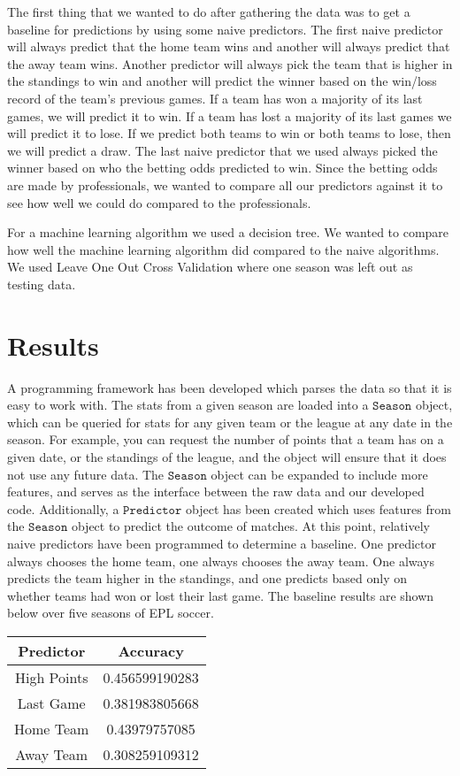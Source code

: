 \documentclass[conference]{IEEEtran}
\begin{document}
The first thing that we wanted to do after gathering the data was to get a baseline for predictions by using some naive predictors. The first naive predictor will always predict that the home team wins and another will always predict that the away team wins. Another predictor will always pick the team that is higher in the standings to win and another will predict the winner based on the win/loss record of the team's previous games. If a team has won a majority of its last games, we will predict it to win. If a team has lost a majority of its last games we will predict it to lose. If we predict both teams to win or both teams to lose, then we will predict a draw. The last naive predictor that we used always picked the winner based on who the betting odds predicted to win. Since the betting odds are made by professionals, we wanted to compare all our predictors against it to see how well we could do compared to the professionals.

For a machine learning algorithm we used a decision tree. We wanted to compare how well the machine learning algorithm did compared to the naive algorithms. We used Leave One Out Cross Validation where one season was left out as testing data.

\section{Results}
A programming framework has been developed which parses the data so that it is easy to work with. The stats from a given season are loaded into a $\mathtt{Season}$ object, which can be queried for stats for any given team or the league at any date in the season. For example, you can request the number of points that a team has on a given date, or the standings of the league, and the object will ensure that it does not use any future data. The $\mathtt{Season}$ object can be expanded to include more features, and serves as the interface between the raw data and our developed code. Additionally, a $\mathtt{Predictor}$ object has been created which uses features from the $\mathtt{Season}$ object to predict the outcome of matches. At this point, relatively naive predictors have been programmed to determine a baseline. One predictor always chooses the home team, one always chooses the away team. One always predicts the team higher in the standings, and one predicts based only on whether teams had won or lost their last game. The baseline results are shown below over five seasons of EPL soccer.

\begin{center}
  \begin{tabular}{@{} cc @{}}
    \hline
    Predictor & Accuracy \\ 
    \hline
High Points & 0.456599190283 \\ 
    Last Game & 0.381983805668\\ 
    Home Team & 0.43979757085 \\ 
    Away Team & 0.308259109312\\ 
    \hline
  \end{tabular}
\end{center}
\end{document}
